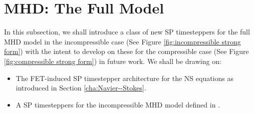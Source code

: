 \section{MHD: The Full Model}\label{cha:MHD}
    In this subsection, we shall introduce a class of new SP timesteppers for the full MHD model in the incompressible case (See Figure \ref{fig:incompressible strong form}) with the intent to develop on these for the compressible case (See Figure \ref{fig:compressible strong form}) in future work. We shall be drawing on:
    \begin{itemize}
        \item  The FET-induced SP timestepper architecture for the NS equations as introduced in Section \ref{cha:Navier--Stokes}.
        \item  A SP timesteppers for the incompressible MHD model defined in \cite{Laakmann_Hu_Farrell_2022}.
    \end{itemize}


    
    
